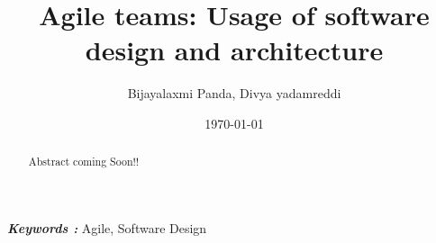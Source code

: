 \documentclass{article}
\begin{document}
	\title{Agile teams: Usage of software design and architecture}
	\author{Bijayalaxmi Panda, Divya yadamreddi}
	\providecommand{\keywords}[1]{\textbf{\textit{Keywords : }} #1}
	\date{\today}
	\maketitle
	\begin{abstract}
		Abstract coming Soon!!
	\end{abstract}
	\keywords{Agile, Software Design}
\end{document}
